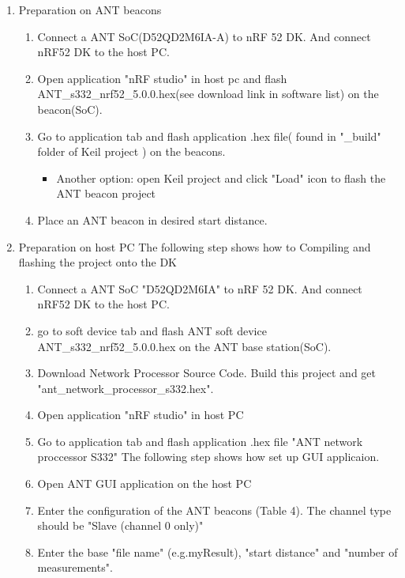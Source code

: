 \documentclass{article}
\begin{document}
\begin{enumerate}

\item Preparation on ANT beacons
	\begin{enumerate}
	\item  Connect a ANT SoC(D52QD2M6IA-A) to nRF 52 DK. And connect nRF52 DK to the host PC.
	\item  Open application "nRF studio" in host pc and flash  ANT\_s332\_nrf52\_5.0.0.hex(see download link in software list)  on the beacon(SoC).
	\item  Go to application tab and flash application .hex file( found in "\_build" folder 	of Keil project ) on the beacons.
		\begin{itemize}
		\item Another option: open Keil project and click "Load" icon to flash the ANT beacon project
		\end{itemize}
	\item Place an ANT beacon in desired start distance.
\end{enumerate}

\item Preparation on host PC
The following step shows how to Compiling and flashing the project onto the DK \\
	\begin{enumerate}
	\item Connect a ANT SoC "D52QD2M6IA" to nRF 52 DK. And connect nRF52 DK to the host PC.
	\item go to soft device tab and flash ANT soft device ANT\_s332\_nrf52\_5.0.0.hex on the ANT base station(SoC).
	\item Download Network Processor Source Code. Build this project and get  "ant\_network\_processor\_s332.hex".
	\item Open application "nRF studio" in host PC
	\item Go to application tab and flash application .hex file "ANT network proccessor S332"
The following step shows how set up GUI applicaion.
	\item Open ANT GUI application on the host PC
	\item Enter the configuration of the ANT beacons (Table 4). The channel type should be "Slave (channel 0 only)"
	\item Enter the base "file name" (e.g.myResult), "start distance" and "number of measurements".
	\end{enumerate}
	

\end{enumerate}
\end{document}

